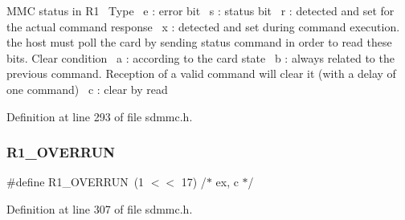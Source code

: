 M\+MC status in R1~\newline
 Type~\newline
 e \+: error bit~\newline
 s \+: status bit~\newline
 r \+: detected and set for the actual command response~\newline
 x \+: detected and set during command execution. the host must poll the card by sending status command in order to read these bits. Clear condition~\newline
 a \+: according to the card state~\newline
 b \+: always related to the previous command. Reception of a valid command will clear it (with a delay of one command)~\newline
 c \+: clear by read~\newline
 



Definition at line 293 of file sdmmc.\+h.

\mbox{\label{group___c_h_i_p___s_d_m_m_c___definitions_ga340950dfbe00e230be6b24a94cc21ce3}} 
\subsubsection{\texorpdfstring{R1\+\_\+\+O\+V\+E\+R\+R\+UN}{R1\_OVERRUN}}
{\footnotesize\ttfamily \#define R1\+\_\+\+O\+V\+E\+R\+R\+UN~(1 $<$$<$ 17)	/$\ast$ ex, c $\ast$/}



Definition at line 307 of file sdmmc.\+h.

\mbox{\label{group___c_h_i_p___s_d_m_m_c___definitions_ga1f5d0285e83c1856a126b9763904e652}} 
